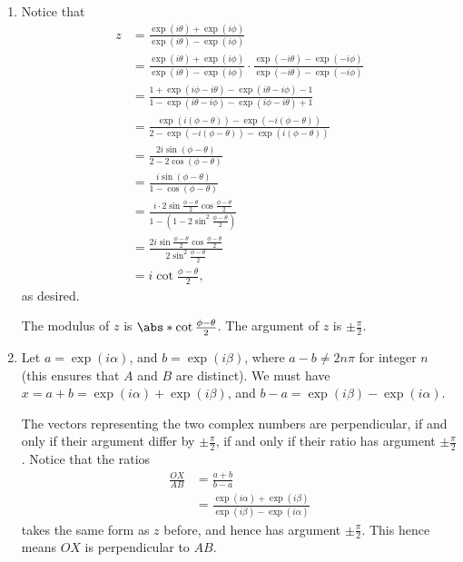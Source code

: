 \Question{\currfilebase}
\begin{enumerate}
    \item Notice that
          \begin{align*}
              z & = \frac{\exp(i\theta) + \exp(i\phi)}{\exp(i\theta) - \exp(i\phi)}                                                                           \\
                & = \frac{\exp(i\theta) + \exp(i\phi)}{\exp(i\theta) - \exp(i\phi)} \cdot \frac{\exp(-i\theta) - \exp(-i\phi)}{\exp(-i\theta) - \exp(-i\phi)} \\
                & = \frac{1 + \exp(i\phi - i\theta) - \exp(i\theta - i\phi) - 1}{1 - \exp(i \theta - i \phi) - \exp(i \phi - i \theta) + 1}                   \\
                & = \frac{\exp(i(\phi - \theta)) - \exp(-i(\phi - \theta))}{2 - \exp(- i (\phi - \theta)) - \exp(i (\phi - \theta))}                          \\
                & = \frac{2i \sin (\phi - \theta)}{2 - 2 \cos (\phi - \theta)}                                                                                \\
                & = \frac{i\sin (\phi - \theta)}{1 - \cos (\phi - \theta)}                                                                                    \\
                & = \frac{i \cdot 2 \sin \frac{\phi - \theta}{2} \cos \frac{\phi - \theta}{2}}{1 - (1 - 2 \sin^2 \frac{\phi - \theta}{2})}                    \\
                & = \frac{2i \sin \frac{\phi - \theta}{2} \cos \frac{\phi - \theta}{2}}{2 \sin^2 \frac{\phi - \theta}{2}}                                     \\
                & = i \cot \frac{\phi - \theta}{2},
          \end{align*}
          as desired.

          The modulus of \(z\) is \(\abs*{\cot \frac{\phi - \theta}{2}}\). The argument of \(z\) is \(\pm \frac{\pi}{2}\).

    \item Let \(a = \exp(i \alpha)\), and \(b = \exp(i \beta)\), where \(a - b \neq 2n\pi\) for integer \(n\) (this ensures that \(A\) and \(B\) are distinct). We must have \(x = a + b = \exp(i\alpha) + \exp (i \beta)\), and \(b - a = \exp(i \beta) - \exp(i \alpha)\).

          The vectors representing the two complex numbers are perpendicular, if and only if their argument differ by \(\pm \frac{\pi}{2}\), if and only if their ratio has argument \(\pm \frac{\pi}{2}\). Notice that the ratios
          \begin{align*}
              \frac{OX}{AB} & = \frac{a + b}{b - a}                                                 \\
                            & = \frac{\exp (i\alpha) + \exp(i\beta)}{\exp(i\beta) - \exp(i \alpha)}
          \end{align*}
          takes the same form as \(z\) before, and hence has argument \(\pm \frac{\pi}{2}\). This hence means \(OX\) is perpendicular to \(AB\).


\end{enumerate}
